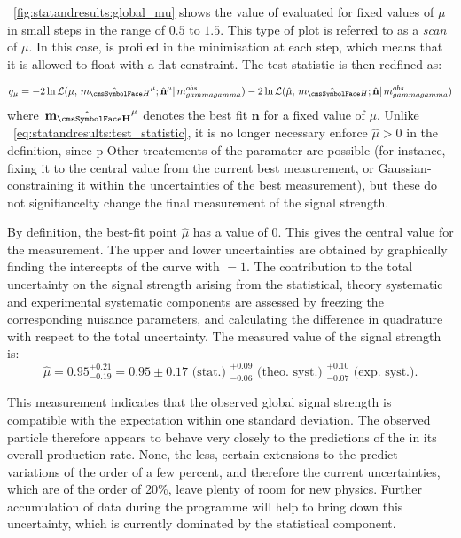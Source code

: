 \Fig~\ref{fig:statandresults:global_mu} shows the value of \DNLL evaluated for fixed values of $\mu$ in small steps in the range of $0.5$ to $1.5$. This type of plot is referred to as a \DNLL \emph{scan} of $\mu$. In this case, \mH is profiled in the minimisation at each step, which means that it is allowed to float with a flat constraint. The test statistic is then redfined as: %

\begin{equation}
\label{eq:statandresults:test_statistic_profMH}
q_{\mu} = -2 \ln \mathcal{L}(\mu,\hat{\mH}^{\mu} ; \hat{\mathbf{n}}^{\mu}| \mgg^{obs})- 2\ln\mathcal{L}(\hat{\mu},\hat{\mH} ;\hat{\mathbf{n}}| \mgg^{obs} ) 
\end{equation}
where $\hat{\mathbf{\mH}}^{\mu}$ denotes the best fit $\mathbf{n}$ for a fixed value of $\mu$. Unlike \Eq~\ref{eq:statandresults:test_statistic}, it is no longer necessary enforce $\hat{\mu}>0$ in the definition, since p Other treatements of the \mH paramater are possible (for instance, fixing it to the central value from the current best measurement, or Gaussian-constraining it within the uncertainties of the best measurement), but these do not signifiancelty change the final measurement of the signal strength.

By definition, the best-fit point $\hat{\mu}$ has a \DNLL value of $0$. This gives the central value for the measurement. The upper and lower uncertainties are obtained by graphically finding the intercepts of the curve with \DNLL$=1$. 
The contribution to the total uncertainty on the signal strength arising from the statistical, theory systematic and experimental systematic components are assessed by freezing the corresponding nuisance parameters, and calculating the difference in quadrature with respect to the total uncertainty. 
The measured value of the signal strength is:
\begin{equation*}
\hat{\mu}=0.95 ^{+0.21}_{-0.19} = 0.95 \pm 0.17 \text{ (stat.) }^{+0.09}_{-0.06} \text{ (theo. syst.) }^{+0.10}_{-0.07} \text{ (exp. syst.)}. 
\end{equation*}

This measurement indicates that the observed global signal strength is compatible with the \SM expectation within one standard deviation. The observed particle therefore appears to behave very closely to the predictions of the \SM in its overall production rate. None, the less, certain extensions to the \SM predict variations of the order of a few percent, and therefore the current uncertainties, which are of the order of 20\%, leave plenty of room for new physics. Further accumulation of data during the \LHC programme will help to bring down this uncertainty, which is currently dominated by the statistical component.

